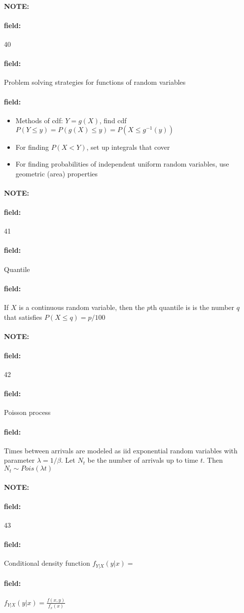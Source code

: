 \documentclass[12pt]{article}
\newenvironment{note}{\paragraph{NOTE:}}{}
\newenvironment{field}{\paragraph{field:}}{}
\begin{document}
\begin{note}
  \begin{field}
    \tiny 40
  \end{field}
  \begin{field}
    Problem solving strategies for functions of random variables
  \end{field}
  \begin{field}
    \begin{itemize}
      \item Methods of cdf: $Y = g(X)$, find cdf $P(Y \leq y) = P(g(X) \leq y) = P(X \leq g^{-1}(y))$
      \item For finding $P(X < Y)$, set up integrals that cover
      \item For finding probabilities of independent uniform random variables, use geometric (area) properties
    \end{itemize}
  \end{field}
\end{note}


\begin{note}
  \begin{field}
    \tiny 41
  \end{field}
  \begin{field}
    Quantile
  \end{field}
  \begin{field}
    If $X$ is a continuous random variable, then the $p$th quantile is is the number $q$ that satisfies $P(X \leq q) = p/100 $
  \end{field}
\end{note}

\begin{note}
  \begin{field}
    \tiny 42
  \end{field}
  \begin{field}
    Poisson process
  \end{field}
  \begin{field}
    Times between arrivals are modeled as iid exponential random variables with parameter $\lambda = 1/\beta$. Let $N_t$ be the number of arrivals up to time $t$. Then $N_t \sim Pois(\lambda t)$
  \end{field}
\end{note}


\begin{note}
  \begin{field}
    \tiny 43
  \end{field}
  \begin{field}
    Conditional density function $f_{Y|X}(y|x) = $
  \end{field}
  \begin{field}
    $f_{Y|X}(y|x) = \frac{f(x,y)}{f_x(x)}$
  \end{field}
\end{note}
\end{document}
